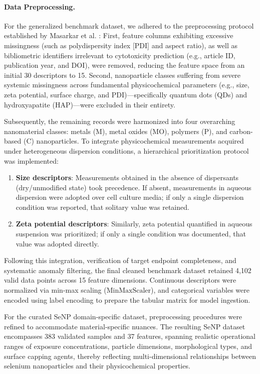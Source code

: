 \paragraph{Data Preprocessing.}
For the generalized benchmark dataset, we adhered to the preprocessing protocol established by Masarkar et al. \cite{masarkar2024}:
First, feature columns exhibiting excessive missingness (such as polydispersity index [PDI] and aspect ratio), as well as bibliometric identifiers irrelevant to cytotoxicity prediction (e.g., article ID, publication year, and DOI), were removed, reducing the feature space from an initial 30 descriptors to 15.
Second, nanoparticle classes suffering from severe systemic missingness across fundamental physicochemical parameters (e.g., size, zeta potential, surface charge, and PDI)—specifically quantum dots (QDs) and hydroxyapatite (HAP)—were excluded in their entirety.

Subsequently, the remaining records were harmonized into four overarching nanomaterial classes: metals (M), metal oxides (MO), polymers (P), and carbon-based (C) nanoparticles.
To integrate physicochemical measurements acquired under heterogeneous dispersion conditions, a hierarchical prioritization protocol was implemented:

\begin{enumerate}
  \item \textbf{Size descriptors}:
Measurements obtained in the absence of dispersants (dry/unmodified state) took precedence. If absent, measurements in aqueous dispersion were adopted over cell culture media; if only a single dispersion condition was reported, that solitary value was retained.

  \item \textbf{Zeta potential descriptors}:
Similarly, zeta potential quantified in aqueous suspension was prioritized; if only a single condition was documented, that value was adopted directly.
\end{enumerate}

Following this integration, verification of target endpoint completeness, and systematic anomaly filtering, the final cleaned benchmark dataset retained 4,102 valid data points across 15 feature dimensions.
Continuous descriptors were normalized via min-max scaling ($\text{MinMaxScaler}$), and categorical variables were encoded using label encoding to prepare the tabular matrix for model ingestion.

For the curated SeNP domain-specific dataset, preprocessing procedures were refined to accommodate material-specific nuances.
The resulting SeNP dataset encompasses 383 validated samples and 37 features, spanning realistic operational ranges of exposure concentrations, particle dimensions, morphological types, and surface capping agents, thereby reflecting multi-dimensional relationships between selenium nanoparticles and their physicochemical properties.

